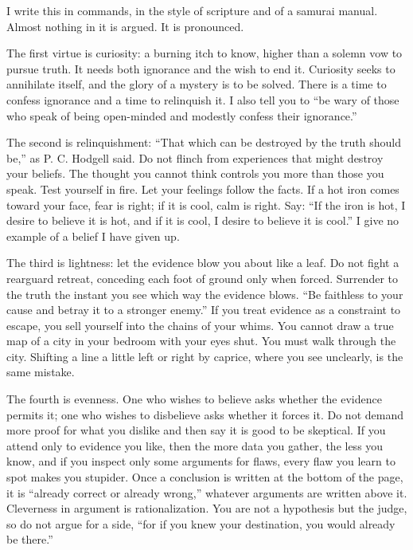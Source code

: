 
I write this in commands, in the style of scripture and of a samurai manual. Almost nothing in it is argued. It is pronounced.

The first virtue is curiosity: a burning itch to know, higher than a solemn vow to pursue truth. It needs both ignorance and the wish to end it. Curiosity seeks to annihilate itself, and the glory of a mystery is to be solved. There is a time to confess ignorance and a time to relinquish it. I also tell you to ``be wary of those who speak of being open-minded and modestly confess their ignorance.''

The second is relinquishment: ``That which can be destroyed by the truth should be,'' as P. C. Hodgell said. Do not flinch from experiences that might destroy your beliefs. The thought you cannot think controls you more than those you speak. Test yourself in fire. Let your feelings follow the facts. If a hot iron comes toward your face, fear is right; if it is cool, calm is right. Say: ``If the iron is hot, I desire to believe it is hot, and if it is cool, I desire to believe it is cool.'' I give no example of a belief I have given up.

The third is lightness: let the evidence blow you about like a leaf. Do not fight a rearguard retreat, conceding each foot of ground only when forced. Surrender to the truth the instant you see which way the evidence blows. ``Be faithless to your cause and betray it to a stronger enemy.'' If you treat evidence as a constraint to escape, you sell yourself into the chains of your whims. You cannot draw a true map of a city in your bedroom with your eyes shut. You must walk through the city. Shifting a line a little left or right by caprice, where you see unclearly, is the same mistake.

The fourth is evenness. One who wishes to believe asks whether the evidence permits it; one who wishes to disbelieve asks whether it forces it. Do not demand more proof for what you dislike and then say it is good to be skeptical. If you attend only to evidence you like, then the more data you gather, the less you know, and if you inspect only some arguments for flaws, every flaw you learn to spot makes you stupider. Once a conclusion is written at the bottom of the page, it is ``already correct or already wrong,'' whatever arguments are written above it. Cleverness in argument is rationalization. You are not a hypothesis but the judge, so do not argue for a side, ``for if you knew your destination, you would already be there.'' 

